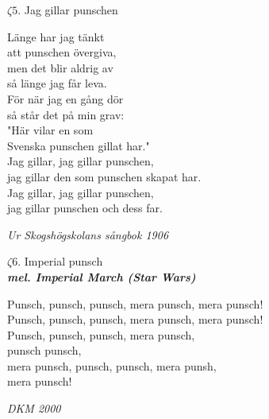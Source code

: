 \documentclass[a6paper,10pt]{article}
\newcommand{\mel}[1]{\small\textbf{\textit{mel. #1 \\}}}
\begin{document}
\setlength{\oddsidemargin}{-0.47in}
\noindent
\begin{center}
\Large $\zeta5$. Jag gillar punschen \\ 
\end{center}
Länge har jag tänkt\\
att punschen övergiva,\\
men det blir aldrig av\\
så länge jag får leva.\\
För när jag en gång dör\\
så står det på min grav:\\
"Här vilar en som\\
Svenska punschen gillat har."
\vspace{5pt}\\
Jag gillar, jag gillar punschen,\\
jag gillar den som punschen skapat har.\\
Jag gillar, jag gillar punschen,\\
jag gillar punschen och dess far.
\begin{flushright}
\textit{Ur Skogshögskolans sångbok 1906}
\end{flushright}
\vfill
\begin{center}
\Large $\zeta6$. Imperial punsch \\ 
\mel{Imperial March (Star Wars)}
\end{center}
Punsch, punsch, punsch, mera punsch, mera punsch!\\
Punsch, punsch, punsch, mera punsch, mera punsch!
\vspace{5pt}\\
Punsch, punsch, punsch, mera punsch,\\
punsch punsch,\\
mera punsch, punsch, punsch, mera punsh,\\
mera punsch!
\begin{flushright}
\textit{DKM 2000}
\end{flushright}
\end{document}
